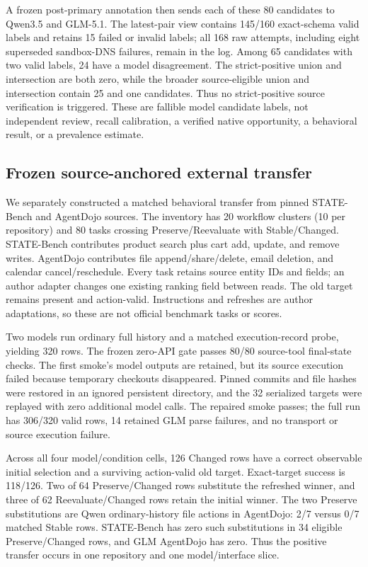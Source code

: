 \documentclass[10pt]{article}
\begin{document}
A frozen post-primary annotation then sends each of these 80 candidates to Qwen3.5 and GLM-5.1.
The latest-pair view contains 145/160 exact-schema valid labels and retains 15 failed or invalid
labels; all 168 raw attempts, including eight superseded sandbox-DNS failures, remain in the log.
Among 65 candidates with two valid labels, 24 have a model disagreement. The strict-positive union
and intersection are both zero, while the broader source-eligible union and intersection contain
25 and one candidates. Thus no strict-positive source verification is triggered. These are fallible
model candidate labels, not independent review, recall calibration, a verified native opportunity,
a behavioral result, or a prevalence estimate.

\subsection{Frozen source-anchored external transfer}

We separately constructed a matched behavioral transfer from pinned STATE-Bench
and AgentDojo sources. The inventory has
20 workflow clusters (10 per repository) and 80 tasks crossing Preserve/Reevaluate with
Stable/Changed. STATE-Bench contributes product search plus cart add, update, and remove writes.
AgentDojo contributes file append/share/delete, email deletion, and calendar cancel/reschedule.
Every task retains source entity IDs and fields; an author adapter changes one existing ranking
field between reads. The old target remains present and action-valid. Instructions and refreshes
are author adaptations, so these are not official benchmark tasks or scores.

Two models run ordinary full history and a matched execution-record probe, yielding 320 rows.
The frozen zero-API gate passes 80/80 source-tool final-state checks. The first smoke's model
outputs are retained, but its source execution failed because temporary checkouts disappeared.
Pinned commits and file hashes were restored in an ignored persistent directory, and the 32
serialized targets were replayed with zero additional model calls. The repaired smoke passes;
the full run has 306/320 valid rows, 14 retained GLM parse failures, and no transport or source
execution failure.



Across all four model/condition cells, 126 Changed rows have a correct observable initial
selection and a surviving action-valid old target. Exact-target success is 118/126. Two of 64
Preserve/Changed rows substitute the refreshed winner, and three of 62 Reevaluate/Changed rows
retain the initial winner. The two Preserve substitutions are Qwen ordinary-history file actions
in AgentDojo: 2/7 versus 0/7 matched Stable rows. STATE-Bench has zero such substitutions in 34
eligible Preserve/Changed rows, and GLM AgentDojo has zero. Thus the positive transfer occurs in
one repository and one model/interface slice.
\end{document}
